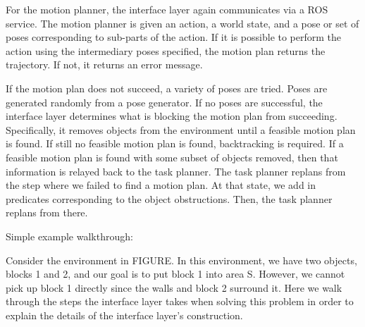 \documentclass[12pt]{article}
\begin{document}
For the motion planner, the interface layer again communicates via a ROS service.  
The motion planner is given an action, a world state, and a pose or set of poses corresponding to sub-parts of the action.  
If it is possible to perform the action using the intermediary poses specified, the motion plan returns the trajectory.  
If not, it returns an error message.

If the motion plan does not succeed, a variety of poses are tried.  
Poses are generated randomly from a pose generator.  
If no poses are successful, the interface layer determines what is blocking the motion plan from succeeding.  
Specifically, it removes objects from the environment until a feasible motion plan is found.  
If still no feasible motion plan is found, backtracking is required.  
If a feasible motion plan is found with some subset of objects removed, then that information is relayed back to the task planner.  
The task planner replans from the step where we failed to find a motion plan.  
At that state, we add in predicates corresponding to the object obstructions.  
Then, the task planner replans from there.  


Simple example walkthrough:

Consider the environment in FIGURE.  
In this environment, we have two objects, blocks 1 and 2, and our goal is to put block 1 into area S.  
However, we cannot pick up block 1 directly since the walls and block 2 surround it.  
Here we walk through the steps the interface layer takes when solving this problem in order to explain the details of the interface layer's construction.
\end{document}
